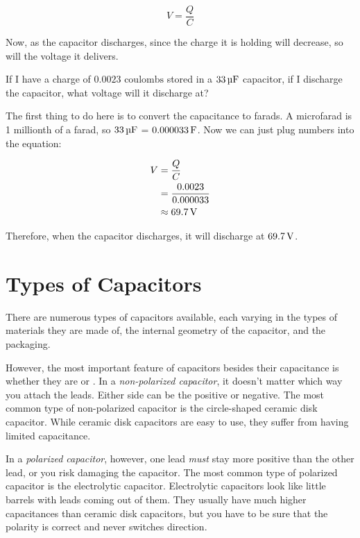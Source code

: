 \begin{equation}
\label{eqCapacitanceToVoltage}
V = \frac{Q}{C}
\end{equation}

Now, as the capacitor discharges, since the charge it is holding will decrease, so will the voltage it delivers.

\begin{exampleprob}
If I have a charge of $0.0023 \textrm{ coulombs}$ stored in a $33\,\si{\micro\farad}$ capacitor, if I discharge the capacitor, what voltage will it discharge at?

The first thing to do here is to convert the capacitance to farads.  A microfarad is 1 millionth of a farad, so $33\,\si{\micro\farad}$ = $0.000033\,\si{\farad}$.
Now we can just plug numbers into the equation:

\begin{align*}
V &= \frac{Q}{C} \\
  &= \frac{0.0023}{0.000033} \\
  &\approx 69.7\,\si{\volt}
\end{align*}

Therefore, when the capacitor discharges, it will discharge at $69.7\,\si{\volt}$.

\end{exampleprob}

\section{Types of Capacitors}

There are numerous types of capacitors available, each varying in the types of materials they are made of, the internal geometry of the capacitor, and the packaging.


However, the most important feature of capacitors besides their capacitance is whether they are  or .
In a \emph{non-polarized capacitor}, it doesn't matter which way you attach the leads.
Either side can be the positive or negative.
The most common type of non-polarized capacitor is the circle-shaped ceramic disk capacitor.
While ceramic disk capacitors are easy to use, they suffer from having limited capacitance.

In a \emph{polarized capacitor}, however, one lead \emph{must} stay more positive than the other lead, or you risk damaging the capacitor.
The most common type of polarized capacitor is the electrolytic capacitor.
Electrolytic capacitors look like little barrels with leads coming out of them.
They usually have much higher capacitances than ceramic disk capacitors, but you have to be sure that the polarity is correct and never switches direction.

